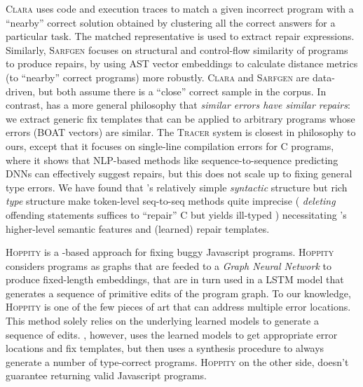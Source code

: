 %
\textsc{Clara} \citep{Gulwani_2018} uses code and execution traces to match a
given incorrect program with a ``nearby'' correct solution obtained by
clustering all the correct answers for a particular task. The matched
representative is used to extract repair expressions.
%
Similarly, \textsc{Sarfgen} \citep{Wang_2018} focuses on structural and
control-flow similarity of programs to produce repairs, by using AST vector
embeddings to calculate distance metrics (to ``nearby'' correct
programs) more robustly.
%
\textsc{Clara} and \textsc{Sarfgen} are data-driven, but both assume
there is a ``close'' correct sample in the corpus.
%
In contrast, \toolname has a more general philosophy that \emph{similar errors
have similar repairs}: we extract generic fix templates that can be applied to
arbitrary programs whose errors (BOAT vectors) are similar.
%
The \textsc{Tracer} system \citep{TRACER2018} is closest in philosophy to ours,
except that it focuses on single-line compilation errors for C programs, where
it shows that NLP-based methods like sequence-to-sequence predicting DNNs can
effectively suggest repairs, %
but this does not scale up to fixing general type errors.
%
We have found that \ocaml's relatively simple
\emph{syntactic} structure but rich \emph{type}
structure make token-level seq-to-seq methods quite imprecise (\eg
\emph{deleting} offending statements suffices to ``repair'' C but yields
ill-typed \ocaml) necessitating \toolname's higher-level semantic features and
(learned) repair templates.

\textsc{Hoppity} \citep{Dinella_2020} is a \dnn-based approach for fixing buggy
Javascript programs. \textsc{Hoppity} considers programs as graphs that are
feeded to a \textit{Graph Neural Network} to produce fixed-length embeddings,
that are in turn used in a LSTM model that generates a sequence of primitive
edits of the program graph. To our knowledge, \textsc{Hoppity} is one of the few
pieces of art that can address multiple error locations. This method solely
relies on the underlying learned models to generate a sequence of edits.
\toolname, however, uses the learned models to get appropriate error locations
and fix templates, but then uses a synthesis procedure to always generate a
number of type-correct programs. \textsc{Hoppity} on the other side, doesn't
guarantee returning valid Javascript programs.

